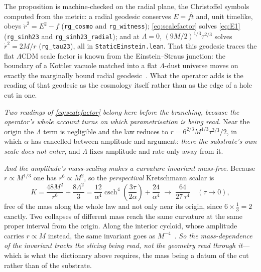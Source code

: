 \documentclass[11pt,a4paper]{article}
\theoremstyle{definition}
\begin{document}
The proposition is machine-checked on the radial plane, the Christoffel symbols computed from the metric: a radial geodesic conserves $E=f\dot t$ and, unit timelike, obeys $\dot r^{2}=E^{2}-f$ (\texttt{rg\_cosmo} and \texttt{rg\_witness}); \eqref{eq:scalefactor} solves \eqref{eq:E1} (\texttt{rg\_sinh23} and \texttt{rg\_sinh23\_radial}); and at $\Lambda=0$, $(9M/2)^{1/3}\tau^{2/3}$ solves $\dot r^{2}=2M/r$ (\texttt{rg\_tau23}), all in \texttt{StaticEinstein.lean}. That this geodesic traces the flat $\Lambda$CDM scale factor is known from the Einstein--Straus junction: the boundary of a Kottler vacuole matched into a flat $\Lambda$-dust universe moves on exactly the marginally bound radial geodesic~\cite{EinsteinStraus1945,BalbinotBergaminiComastri1988}. What the operator adds is the reading of that geodesic as the cosmology itself rather than as the edge of a hole cut in one.

\emph{Two readings of \eqref{eq:scalefactor} belong here before the branching, because the operator's whole account turns on which parametrisation is being read.} Near the origin the $\Lambda$ term is negligible and the law reduces to $r=6^{2/3}M^{1/3}\tau^{2/3}/2$, in which $\alpha$ has cancelled between amplitude and argument: \emph{there the substrate's own scale does not enter}, and $\Lambda$ fixes amplitude and rate only away from it.

\emph{And the amplitude's mass-scaling makes a curvature invariant mass-free.} Because $r\propto M^{1/3}$ one has $r^{6}\propto M^{2}$, so the \emph{perspectival} Kretschmann scalar is
\begin{equation}\label{eq:Kmassfree}
  K=\frac{48M^{2}}{r^{6}}+\frac{8\Lambda^{2}}{3}=\frac{12}{\alpha^{4}}\operatorname{csch}^{4}\!\left(\frac{3\tau}{2\alpha}\right)+\frac{24}{\alpha^{4}}\;\longrightarrow\;\frac{64}{27\,\tau^{4}}\quad(\tau\to0),
\end{equation}
free of the mass along the whole law and not only near its origin, since $6\times\tfrac13=2$ exactly. Two collapses of different mass reach the same curvature at the same proper interval from the origin. Along the interior cycloid, whose amplitude carries $r\propto M$ instead, the same invariant goes as $M^{-4}$~\cite{JanzenCircle}. \emph{So the mass-dependence of the invariant tracks the slicing being read, not the geometry read through it}---which is what the dictionary above requires, the mass being a datum of the cut rather than of the substrate.
\end{document}
